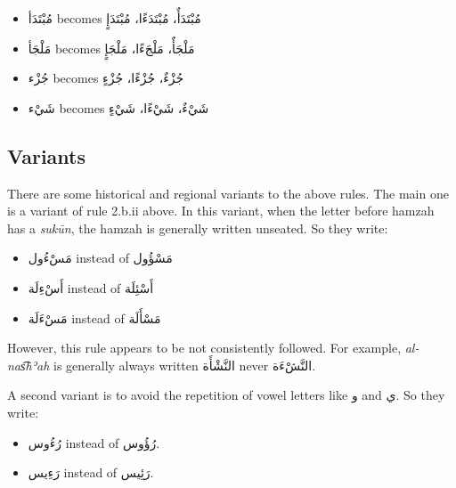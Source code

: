 \documentclass[
  10pt,
]{book}
\providecommand{\tightlist}{%
  \setlength{\itemsep}{0pt}\setlength{\parskip}{0pt}}
\begin{document}
\begin{itemize}
\tightlist
\item
  \foreignlanguage{arabic}{مُبْتَدَأ} becomes \foreignlanguage{arabic}{مُبْتَدَأٌ، مُبْتَدَءًا، مُبْتَدَإٍ}
\item
  \foreignlanguage{arabic}{مَلْجَأ} becomes \foreignlanguage{arabic}{مَلْجَأٌ، مَلْجَءًا، مَلْجَإٍ}
\item
  \foreignlanguage{arabic}{جُزْء} becomes \foreignlanguage{arabic}{جُزْءٌ، جُزْءًا، جُزْءٍ}
\item
  \foreignlanguage{arabic}{شَيْء} becomes \foreignlanguage{arabic}{شَيْءٌ، شَيْءًا، شَيْءٍ}
\end{itemize}

\subsection{Variants}\label{variants}

There are some historical and regional variants to the above rules. The main one is a variant of rule 2.b.ii above. In this variant, when the letter before hamzah has a \emph{sukūn}, the hamzah is generally written unseated. So they write:

\begin{itemize}
\tightlist
\item
  \foreignlanguage{arabic}{مَسْءُول} instead of \foreignlanguage{arabic}{مَسْؤُول}
\item
  \foreignlanguage{arabic}{أَسْءِلَة} instead of \foreignlanguage{arabic}{أَسْئِلَة}
\item
  \foreignlanguage{arabic}{مَسْءَلَة} instead of \foreignlanguage{arabic}{مَسْأَلَة}
\end{itemize}

However, this rule appears to be not consistently followed. For example, \emph{al-nas͡hʾah} is generally always written \foreignlanguage{arabic}{النَّشْأَة} never \foreignlanguage{arabic}{النَّشْءَة}.

A second variant is to avoid the repetition of vowel letters like \foreignlanguage{arabic}{و} and \foreignlanguage{arabic}{ي}. So they write:

\begin{itemize}
\tightlist
\item
  \foreignlanguage{arabic}{رُءُوس} instead of \foreignlanguage{arabic}{رُؤُوس}.
\item
  \foreignlanguage{arabic}{رَءِيس} instead of \foreignlanguage{arabic}{رَئِيس}.
\end{itemize}
\end{document}
